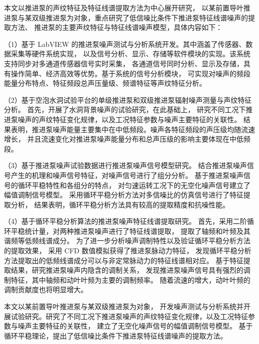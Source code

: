 本文以推进泵的声纹特征及特征线谱提取方法为中心展开研究，
以某前置导叶推进泵与某双级推进泵为对象，重点研究了低信噪比条件下推进泵特征线谱噪声的提取方法、
推进泵的主要声纹特征与特征线谱噪声模型，具体内容如下：

（1）基于 LabVIEW 的推进泵噪声测试与分析系统开发。其中涵盖了传感器、数据采集等硬件系统实现，
以及信号分析、显示、存储等软件模块的实现。该系统支持同步对多通道传感器信号实时采集，
各通道信号同时分析、显示及存储，具有操作简单、经济高效等优势。基于系统的信号分析模块，
可实现对噪声的频段能量分布特点、特征频段总声压量级、频谱特征等声纹特征分析。

（2）基于空泡水洞试验平台的单级推进泵和双级推进泵辐射噪声测量与声纹特征分析。
首先，开展了水洞背景噪声的试验研究，在此基础上，
研究不同工况下推进泵噪声的声纹特征变化规律，以及工况特征参数与噪声主要特征的关联性。
结果表明，推进泵噪声能量主要集中在中低频段。噪声各特征频段的声压级均随流速增长，
并且流速变化对推进泵噪声能量分布和总声压级的影响主要体现在中低频段。

（3）基于推进泵噪声试验数据进行推进泵噪声信号模型研究。
结合推进泵噪声信号产生的机理和噪声信号特征，对噪声信号进行了组分分析。
基于推进泵噪声信号的循环平稳特性和各组分的特点，
对匀速运转工况下的无空化噪声信号建立了幅值调制信号模型。
采用循环平稳分析方法对多信噪比的仿真信号进行了特征提取分析，
结果表明，循环平稳分析方法具有较高的提取精度和抗噪性能。

（4）基于循环平稳分析算法的推进泵噪声特征线谱提取研究。
首先，采用二阶循环平稳统计量，对两种推进泵噪声进行了特征线谱提取，
提取了轴频和叶频及其谐频等低频线谱成分。
为了进一步分析噪声调制特性以及验证循环平稳分析方法的提取效果，
采用 CFD 数值模拟获得了推进泵脉动力特征，
发现循环平稳分析方法提取出的低频线谱成分可以与非定常脉动力的特征线谱相对应。
基于特征提取结果，研究推进泵噪声内隐含的调制关系，
发现推进泵噪声信号具有强烈的调制特征，其中轴频和动叶叶频为主要的调制频率。
随着流速的增大，动叶叶频的调制贡献度也将明显增大。

本文以某前置导叶推进泵与某双级推进泵为对象，
开发噪声测试与分析系统并开展试验研究。研究了不同工况下推进泵噪声的声纹特征变化规律，以及工况特征参数与噪声主要特征的关联性，
建立了无空化噪声信号的幅值调制信号模型。
基于循环平稳理论，提出了低信噪比条件下推进泵特征线谱噪声的提取方法。

\quad

